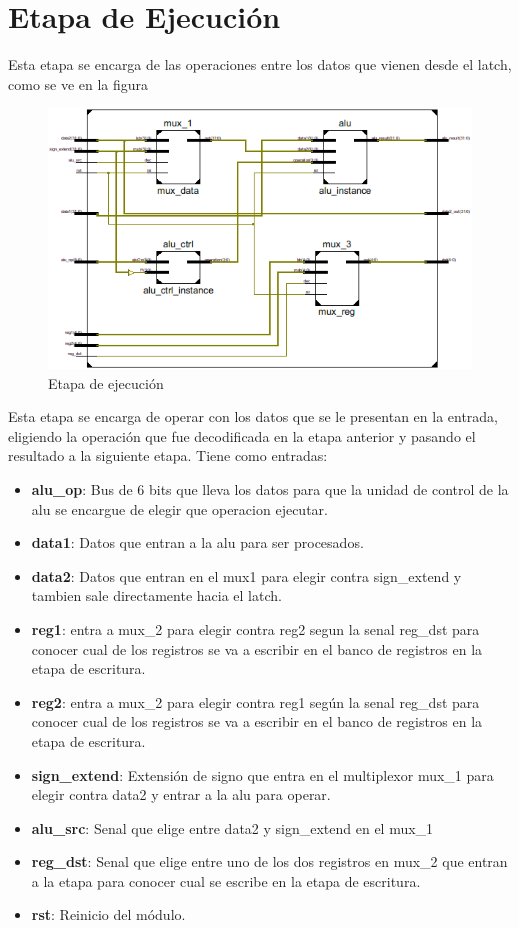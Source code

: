 \section{Etapa de Ejecuci\'on}
Esta etapa se encarga de las operaciones entre los datos que vienen desde el latch, como se ve en la figura 

\begin{figure}[H]
\centering
\includegraphics[scale=0.5]{img/execute_stage_inside}
\caption{Etapa de ejecuci\'on}
\label{fig:fetch}
\end{figure}

Esta etapa se encarga de operar con los datos que se le presentan en la entrada, eligiendo la operaci\'on que fue decodificada en la etapa anterior y pasando el resultado a la siguiente etapa.
Tiene como entradas:

\begin{itemize}
  \item \textbf{alu\_op}: Bus de 6 bits que lleva los datos para que la unidad de control de la alu se encargue de elegir que operacion ejecutar.	
  \item \textbf{data1}: Datos que entran a la alu para ser procesados.
  \item \textbf{data2}: Datos que entran en el mux1 para elegir contra sign\_extend y tambien sale directamente hacia el latch.
  \item \textbf{reg1}: entra a mux\_2 para elegir contra reg2 segun la senal reg\_dst para conocer cual de los registros se va a escribir en el banco de registros en la etapa de escritura.
  \item \textbf{reg2}: entra a mux\_2 para elegir contra reg1 seg\'un la senal reg\_dst para conocer cual de los registros se va a escribir en el banco de registros en la etapa de escritura. 	
  \item \textbf{sign\_extend}: Extensi\'on de signo que entra en el multiplexor mux\_1 para elegir contra data2 y entrar a la alu para operar.
  \item \textbf{alu\_src}: Senal que elige entre data2 y sign\_extend en el mux\_1
  \item \textbf{reg\_dst}: Senal que elige entre uno de los dos registros en mux\_2 que entran a la etapa para conocer cual se escribe en la etapa de escritura.
  \item \textbf{rst}: Reinicio del m\'odulo. 
\end{itemize}

